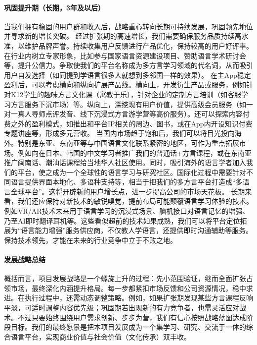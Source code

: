 \paragraph{巩固提升期（长期，3年及以后）}当我们拥有稳固的用户群和收入后，战略重心转向长期可持续发展，巩固领先地位并寻求新的增长突破。
	经过扩张期的高速增长，我们需要确保服务品质持续高水准，以维护品牌声誉。持续收集用户反馈进行产品优化，保持较高的用户好评率。在行业内树立专家形象，比如参与国家语言资源建设项目、赞助语言学术研讨会等，提升公信力。争取使我们的平台名称成为多方言学习领域的代名词，从而吸引用户自发选择（如同提到学语言很多人就想到多邻国一样的效果）。
	在主App稳定盈利后，可以考虑横向和纵向扩展产品线。横向上，开发衍生产品或服务，例如针对K12学生的趣味方言文化课（寓教于乐），针对企业的定制方言培训（如客服学习方言服务下沉市场）等。纵向上，深挖现有用户价值，提供高级会员服务（如一对一真人导师点评发音、线下沉浸式方言游学营等高价服务）。还可以探索内容付费之外的盈利模式，如推出和平台IP相关的周边、图书，或在App内开设知识付费专题讲座等，形成多元营收。
	当国内市场趋于饱和后，我们可以将目光投向海外。特别是东亚、东南亚等与中国语言文化联系紧密的地区，可作为重点拓展市场。例如向在日本、韩国的中文学习者推广我们的普通话+方言课程，或在东南亚推广闽南话、潮汕话课程给当地华人社区使用。同时，吸引海外的语言学者加入我们的平台，使之成为一个全球性的语言学习与研究社区。国际化过程中需要针对不同语言提供界面本地化、多语种支持等，相当于把我们的多方言平台打造成“多语言全球平台”。这将开辟新的用户增长点，进一步提高公司的市场天花板。
	长期来看，我们还应保持对新技术的敏锐嗅觉，提前布局可能颠覆语言学习体验的技术。例如VR/AR技术未来用于语言学习的沉浸式场景、脑机接口对语言记忆的增强、乃至AI即时翻译耳机等。这些看似超前的技术如果成熟，我们可以将平台定位拓展为“语言能力增强”服务供应商，不仅教人学语言，还提供即时沟通辅助等服务。保持技术领先，才能在未来的行业竞争中立于不败之地。

\paragraph{发展战略总结}概括而言，项目发展战略是一个螺旋上升的过程：先小范围验证，继而全面扩张占领市场，最终深化内涵提升格局。每一步都紧扣市场反馈和公司资源情况，稳中求进。在执行过程中，还需动态调整策略。例如，如果扩张期发现某些方言课程反响平淡，可适时调整内容优先级；巩固期若出现新的有力竞争者，也需灵活应对战术。不过只要始终围绕用户需求创新、步步为营，我们有信心按照战略蓝图达成阶段目标。我们的最终愿景是把本项目发展成为一个集学习、研究、交流于一体的综合语言平台，实现商业价值与社会价值（文化传承）双丰收。